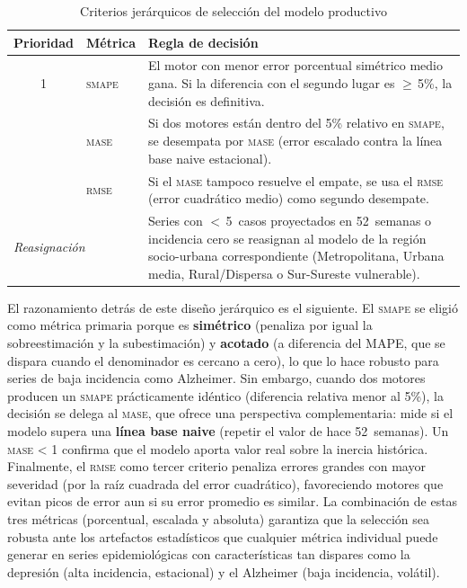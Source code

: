 \documentclass[12pt, letterpaper]{article}
\newcommand{\smape}{\textnormal{\textsc{smape}}}
\newcommand{\mase}{\textnormal{\textsc{mase}}}
\newcommand{\rmse}{\textnormal{\textsc{rmse}}}
\begin{document}
\begin{table}[H]
\centering
\caption{Criterios jerárquicos de selección del modelo productivo}
\label{tab:criterios_seleccion}
\small
\begin{tabularx}{\textwidth}{c l >{\raggedright\arraybackslash}X}
\toprule
\textbf{Prioridad} & \textbf{Métrica} & \textbf{Regla de decisión} \\
\midrule
1 & \smape{} & El motor con menor error porcentual simétrico medio gana. Si la diferencia con el segundo lugar es $\geq$\,5\%, la decisión es definitiva. \\
\addlinespace
2 & \mase{} & Si dos motores están dentro del 5\% relativo en \smape{}, se desempata por \mase{} (error escalado contra la línea base naive estacional). \\
\addlinespace
3 & \rmse{} & Si el \mase{} tampoco resuelve el empate, se usa el \rmse{} (error cuadrático medio) como segundo desempate. \\
\midrule
\multicolumn{2}{l}{\textit{Reasignación}} & Series con $<$\,5~casos proyectados en 52~semanas o incidencia cero se reasignan al modelo de la región socio-urbana correspondiente (Metropolitana, Urbana media, Rural/Dispersa o Sur-Sureste vulnerable). \\
\bottomrule
\end{tabularx}
\end{table}

El razonamiento detrás de este diseño jerárquico es el siguiente. El \smape{} se eligió como métrica primaria porque es \textbf{simétrico} (penaliza por igual la sobreestimación y la subestimación) y \textbf{acotado} (a diferencia del MAPE, que se dispara cuando el denominador es cercano a cero), lo que lo hace robusto para series de baja incidencia como Alzheimer. Sin embargo, cuando dos motores producen un \smape{} prácticamente idéntico (diferencia relativa menor al 5\%), la decisión se delega al \mase{}, que ofrece una perspectiva complementaria: mide si el modelo supera una \textbf{línea base naive} (repetir el valor de hace 52~semanas). Un \mase{} < 1 confirma que el modelo aporta valor real sobre la inercia histórica. Finalmente, el \rmse{} como tercer criterio penaliza errores grandes con mayor severidad (por la raíz cuadrada del error cuadrático), favoreciendo motores que evitan picos de error aun si su error promedio es similar. La combinación de estas tres métricas (porcentual, escalada y absoluta) garantiza que la selección sea robusta ante los artefactos estadísticos que cualquier métrica individual puede generar en series epidemiológicas con características tan dispares como la depresión (alta incidencia, estacional) y el Alzheimer (baja incidencia, volátil).
\end{document}
